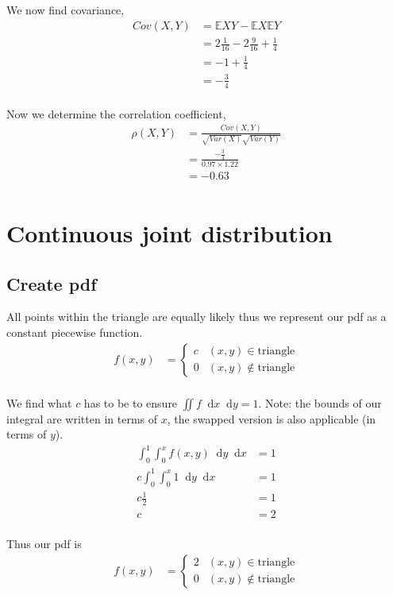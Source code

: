 \documentclass{article}
\newcommand{\diff}{\mathop{}\!\mathrm{d}}
\newcommand{\expect}{\mathbb{E}}
\begin{document}
We now find covariance,
\begin{align*}
    Cov(X,Y) &= \expect XY - \expect X \expect Y \\
    &= 2\frac{1}{16} - 2\frac{9}{16} + \frac{1}{4} \\
    &= -1 + \frac{1}{4} \\
    &= -\frac{3}{4} \\
\end{align*}

Now we determine the correlation coefficient,
\begin{align*}
    \rho(X,Y) &= \frac{Cov(X,Y)}{\sqrt{Var(X)}\sqrt{Var(Y)}} \\
    &= \frac{-\frac{3}{4}}{0.97 \times 1.22} \\
    &= -0.63 \\
\end{align*}

\section{Continuous joint distribution}
\subsection{Create pdf}
All points within the triangle are equally likely thus we represent our
pdf as a constant piecewise function.
\begin{align*}
    f(x,y)
    &=
    \begin{cases}
        c & (x,y) \in \text{triangle} \\
        0 & (x,y) \notin \text{triangle}
    \end{cases} \\
\end{align*}

We find what $c$ has to be to ensure $\iint f \diff x \diff y = 1$.
Note: the bounds of our integral are written in terms of $x$, the swapped
version is also applicable (in terms of $y$).
\begin{align*}
    \int_0^1 \int_0^x f(x,y) \diff y \diff x &= 1 \\
    c \int_0^1 \int_0^x 1 \diff y \diff x &= 1 \\
    c \frac{1}{2} &= 1 \\
    c &= 2 \\
\end{align*}

Thus our pdf is 
\begin{align*}
    f(x,y)
    &=
    \begin{cases}
        2 & (x,y) \in \text{triangle} \\
        0 & (x,y) \notin \text{triangle}
    \end{cases} \\
\end{align*}
\end{document}
